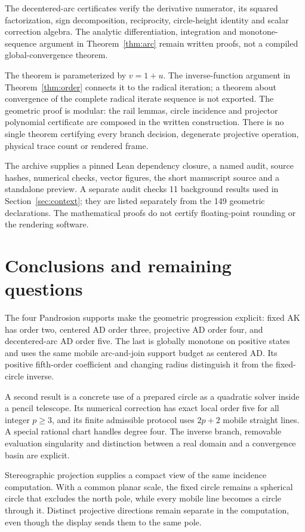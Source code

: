 \documentclass[11pt,a4paper]{article}
\theoremstyle{remark}\newtheorem{remark}[theorem]{Remark}
\begin{document}
\noindent The decentered-arc certificates verify the derivative numerator, its squared factorization, sign decomposition, reciprocity, circle-height identity and scalar correction algebra. The analytic differentiation, integration and monotone-sequence argument in Theorem~\ref{thm:arc} remain written proofs, not a compiled global-convergence theorem.

The theorem  is parameterized by $v=1+u$. The inverse-function argument in Theorem~\ref{thm:order} connects it to the radical iteration; a theorem about convergence of the complete radical iterate sequence is not exported. The geometric proof is modular: the rail lemmas, circle incidence and projector polynomial certificate are composed in the written construction. There is no single theorem certifying every branch decision, degenerate projective operation, physical trace count or rendered frame.

The archive supplies a pinned Lean dependency closure, a named audit, source hashes, numerical checks, vector figures, the short manuscript source and a standalone preview. A separate audit checks 11 background results used in Section~\ref{sec:context}; they are listed separately from the 149 geometric declarations. The mathematical proofs do not certify floating-point rounding or the rendering software.

\section{Conclusions and remaining questions}
The four Pandrosion supports make the geometric progression explicit: fixed AK has order two, centered AD order three, projective AD order four, and decentered-arc AD order five. The last is globally monotone on positive states and uses the same mobile arc-and-join support budget as centered AD. Its positive fifth-order coefficient and changing radius distinguish it from the fixed-circle inverse.

A second result is a concrete use of a prepared circle as a quadratic solver inside a pencil telescope. Its numerical correction has exact local order five for all integer $p\ge3$, and its finite admissible protocol uses $2p+2$ mobile straight lines. A special rational chart handles degree four. The inverse branch, removable evaluation singularity and distinction between a real domain and a convergence basin are explicit.

Stereographic projection supplies a compact view of the same incidence computation. With a common planar scale, the fixed circle remains a spherical circle that excludes the north pole, while every mobile line becomes a circle through it. Distinct projective directions remain separate in the computation, even though the display sends them to the same pole.
\end{document}
